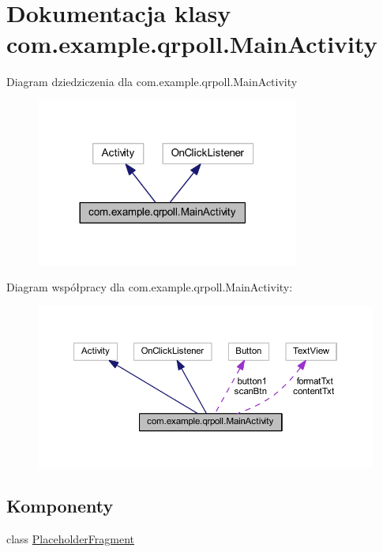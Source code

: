\hypertarget{classcom_1_1example_1_1qrpoll_1_1_main_activity}{\section{Dokumentacja klasy com.\+example.\+qrpoll.\+Main\+Activity}
\label{classcom_1_1example_1_1qrpoll_1_1_main_activity}
}


Diagram dziedziczenia dla com.\+example.\+qrpoll.\+Main\+Activity\nopagebreak
\begin{figure}[H]
\begin{center}
\leavevmode
\includegraphics[width=245pt]{classcom_1_1example_1_1qrpoll_1_1_main_activity__inherit__graph}
\end{center}
\end{figure}


Diagram współpracy dla com.\+example.\+qrpoll.\+Main\+Activity\+:\nopagebreak
\begin{figure}[H]
\begin{center}
\leavevmode
\includegraphics[width=350pt]{classcom_1_1example_1_1qrpoll_1_1_main_activity__coll__graph}
\end{center}
\end{figure}
\subsection*{Komponenty}
\begin{DoxyCompactItemize}
\item 
class \hyperlink{classcom_1_1example_1_1qrpoll_1_1_main_activity_1_1_placeholder_fragment}{Placeholder\+Fragment}
\end{DoxyCompactItemize}

